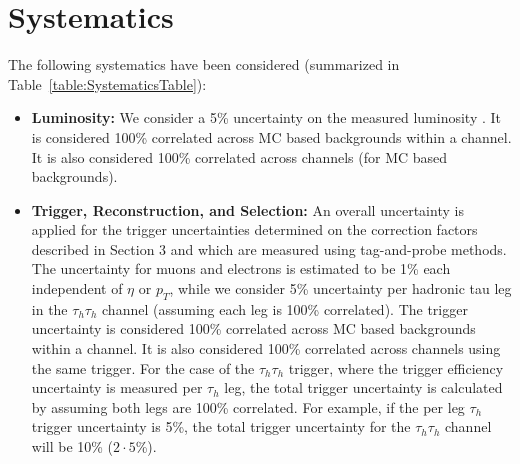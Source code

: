 \section{Systematics}\label{sec:systematics}

The following systematics have been considered (summarized in Table~\ref{table:SystematicsTable}):

\begin{itemize}
%

  \item \textbf{Luminosity:} We consider a 5\% uncertainty on the measured luminosity \cite{REFLUMI}. It is considered 100\% correlated across MC based 
backgrounds within a channel. It is also considered 100\% correlated across channels (for MC based backgrounds).

  \item \textbf{Trigger, Reconstruction, and Selection:} 
  An overall uncertainty is applied for the trigger uncertainties determined on the 
  correction factors described in Section 3 and which are measured using tag-and-probe methods. 
  The uncertainty for muons and electrons is estimated to be 1\% each independent of $\eta$ or $p_{T}$, while we consider 5\% uncertainty per hadronic tau leg in 
the $\tau_{h}\tau_{h}$ channel (assuming each leg is 100\% correlated). The trigger uncertainty is considered 100\% correlated across MC based backgrounds within 
a channel. It is also considered 100\% correlated across channels using the same trigger. For the case of the $\tau_{h}\tau_{h}$ trigger, where the trigger 
efficiency uncertainty is measured per $\tau_{h}$ leg, the total trigger uncertainty is calculated by assuming both legs are 100\% correlated. For example, if the 
per leg $\tau_{h}$ trigger uncertainty is 5\%, the total trigger uncertainty for the $\tau_{h}\tau_{h}$ channel will be 10\% ($2\cdot 5$\%).


\end{itemize}
